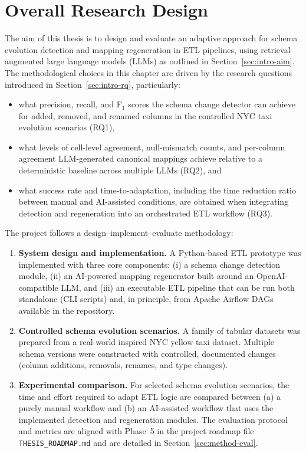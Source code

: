 \section{Overall Research Design}
\label{sec:method-design}

The aim of this thesis is to design and evaluate an adaptive approach for schema
evolution detection and mapping regeneration in ETL pipelines, using
retrieval-augmented large language models (LLMs) as outlined in
Section~\ref{sec:intro-aim}. The methodological choices in this chapter are
driven by the research questions introduced in Section~\ref{sec:intro-rq},
particularly:
%
\begin{itemize}
  \item what precision, recall, and F\(_1\) scores the schema change detector can achieve for added, removed, and renamed columns in the controlled NYC taxi evolution scenarios (RQ1),
  \item what levels of cell-level agreement, null-mismatch counts, and per-column agreement LLM-generated canonical mappings achieve relative to a deterministic baseline across multiple LLMs (RQ2), and
  \item what success rate and time-to-adaptation, including the time reduction ratio between manual and AI-assisted conditions, are obtained when integrating detection and regeneration into an orchestrated ETL workflow (RQ3).
\end{itemize}

The project follows a design–implement–evaluate methodology:
%
\begin{enumerate}
  \item \textbf{System design and implementation.} A Python-based ETL prototype
  was implemented with three core components: (i) a schema change detection
  module, (ii) an AI-powered mapping regenerator built around an
  OpenAI-compatible LLM, and (iii) an executable ETL pipeline that can be run
  both standalone (CLI scripts) and, in principle, from Apache Airflow DAGs
  available in the repository.
  \item \textbf{Controlled schema evolution scenarios.} A family of tabular
  datasets was prepared from a real-world inspired NYC yellow taxi dataset.
  Multiple schema versions were constructed with controlled, documented changes
  (column additions, removals, renames, and type changes).
  \item \textbf{Experimental comparison.} For selected schema evolution
  scenarios, the time and effort required to adapt ETL logic are compared
  between (a) a purely manual workflow and (b) an AI-assisted workflow that
  uses the implemented detection and regeneration modules. The evaluation
  protocol and metrics are aligned with Phase~5 in the project roadmap file
  \texttt{THESIS\_ROADMAP.md} and are detailed in
  Section~\ref{sec:method-eval}.
\end{enumerate}


